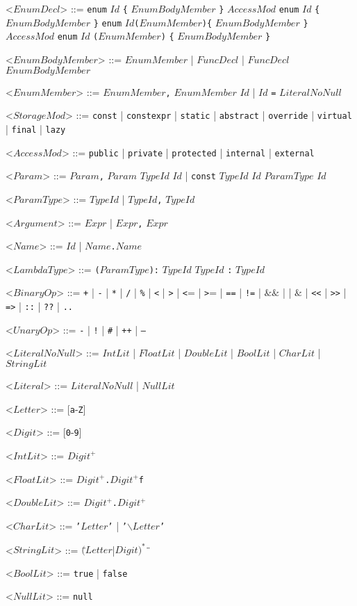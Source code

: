 \documentclass{article}
\newcommand{\gtext}[1]{<$#1$>}
\newcommand{\glit}[1]{\texttt{#1}}
\begin{document}
\begin{grammar}
	\gtext{EnumDecl} ::= \glit{enum} $Id$ \glit{\{} $EnumBodyMember$ \glit{\}}
	\alt $AccessMod$ \glit{enum} $Id$ \glit{\{} $EnumBodyMember$ \glit{\}}
	\alt \glit{enum} $Id$\glit{(}$EnumMember$\glit{)\{} $EnumBodyMember$ \glit{\}}
	\alt $AccessMod$ \glit{enum} $Id$ \glit{(}$EnumMember$\glit{)} \glit{\{} $EnumBodyMember$ \glit{\}}
	
	\gtext{EnumBodyMember} ::= $EnumMember$ | $FuncDecl$ | $FuncDecl$ $EnumBodyMember$
	
	\gtext{EnumMember} ::=  $EnumMember$\glit{,} $EnumMember$
	\alt $Id$ | $Id$ \glit{=} $LiteralNoNull$
	
	\gtext{StorageMod} ::= \glit{const} | \glit{constexpr} | \glit{static} | \glit{abstract} | \glit{override} | \glit{virtual} | \glit{final} | \glit{lazy}
	
	\gtext{AccessMod} ::= \glit{public} | \glit{private} | \glit{protected} | \glit{internal} | \glit{external}
	
	\gtext{Param} ::= $Param$\glit{,} $Param$
	\alt $TypeId$ $Id$ | \glit{const} $TypeId$ $Id$
	\alt $ParamType$ $Id$
	
	\gtext{ParamType} ::= $TypeId$ | $TypeId$\glit{,} $TypeId$

	\gtext{Argument} ::= $Expr$ | $Expr$\glit{,} $Expr$
	
	\gtext{Name} ::= $Id$ | $Name$\glit{.}$Name$	
	
	\newpage	
	
	\gtext{LambdaType} ::= \glit{(}$ParamType$\glit{):} $TypeId$
	\alt $TypeId$ \glit{:} $TypeId$
	
	\gtext{BinaryOp} ::= \glit{+} | \glit{-} | \glit{*} | \glit{/} | \glit{\%} | \glit{\textless} | \glit{\textgreater} | \glit{\textless}= | \glit{\textgreater}= | \glit{==} | \glit{!=}
	\alt \glit{\textbar\textbar} | $\&\&$ | \glit{\textbar} | $\&$ | \glit{\textless\textless} | \glit{\textgreater\textgreater} | \glit{=>} | \glit{::} | \glit{??} | \glit{..}
	
	\gtext{UnaryOp} ::= \glit{-} | \glit{!} | \glit{\#} | \glit{++} | \glit{--}
	
	\gtext{LiteralNoNull}	::= $IntLit$ | $FloatLit$ | $DoubleLit$ | $BoolLit$ | $CharLit$ | $StringLit$
	
	\gtext{Literal}	::= $LiteralNoNull$ | $NullLit$
	
	\gtext{Letter} ::= [\glit{a}-\glit{Z}]
	
	\gtext{Digit} ::= [\glit{0}-\glit{9}]
	
	\gtext{IntLit} ::= $Digit^+$
	
	\gtext{FloatLit} ::= $Digit^+$\glit{.}$Digit^+$\glit{f}
	
	\gtext{DoubleLit} ::= $Digit^+$\glit{.}$Digit^+$

	\gtext{CharLit} ::= \glit{'}$Letter$\glit{'} | \glit{'$\backslash$}$Letter$\glit{'}
	
	\gtext{StringLit} ::= \glit{\"}$(Letter$|$Digit)^*$\glit{\"}	
	
	\gtext{BoolLit} ::= \glit{true} | \glit{false}
	
	\gtext{NullLit} ::= \glit{null}

\end{grammar}
\end{document}
